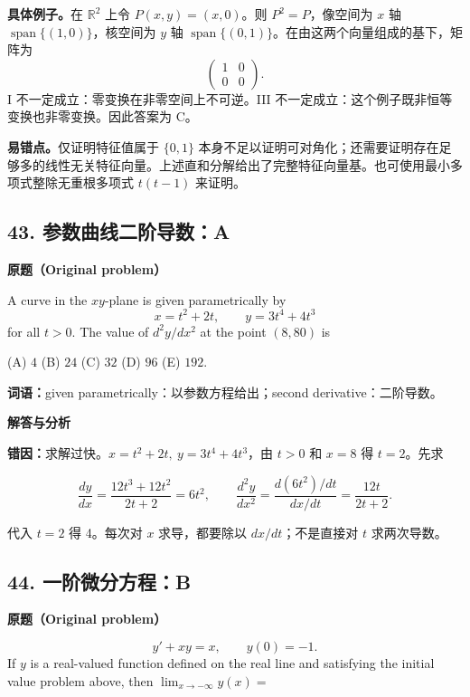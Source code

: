\documentclass[11pt,a4paper]{ctexart}
\begin{document}
\textbf{具体例子。}在 \(\mathbb R^2\) 上令 \(P(x,y)=(x,0)\)。则 \(P^2=P\)，像空间为 \(x\) 轴 \(\operatorname{span}\{(1,0)\}\)，核空间为 \(y\) 轴 \(\operatorname{span}\{(0,1)\}\)。在由这两个向量组成的基下，矩阵为
\[
\begin{pmatrix}1&0\\0&0\end{pmatrix}.
\]
I 不一定成立：零变换在非零空间上不可逆。III 不一定成立：这个例子既非恒等变换也非零变换。因此答案为 C。

\textbf{易错点。}仅证明特征值属于 \(\{0,1\}\) 本身不足以证明可对角化；还需要证明存在足够多的线性无关特征向量。上述直和分解给出了完整特征向量基。也可使用最小多项式整除无重根多项式 \(t(t-1)\) 来证明。

\hypertarget{ux53c2ux6570ux66f2ux7ebfux4e8cux9636ux5bfcux6570a}{%
\subsection{43.
参数曲线二阶导数：A}\label{ux53c2ux6570ux66f2ux7ebfux4e8cux9636ux5bfcux6570a}}

\textbf{原题（Original problem）}\par
A curve in the $xy$-plane is given parametrically by
\[x=t^2+2t,\qquad y=3t^4+4t^3\]
for all $t>0$. The value of $d^2y/dx^2$ at the point $(8,80)$ is

(A) $4$ \quad (B) $24$ \quad (C) $32$ \quad (D) $96$ \quad (E) $192$.

\textbf{词语：}given parametrically：以参数方程给出；second derivative：二阶导数。

\textbf{解答与分析}\par


\textbf{错因：}求解过快。\(x=t^2+2t,\ y=3t^4+4t^3\)，由 \(t>0\) 和
\(x=8\) 得 \(t=2\)。先求

\[\frac{dy}{dx}=\frac{12t^3+12t^2}{2t+2}=6t^2,\qquad \frac{d^2y}{dx^2}=\frac{d(6t^2)/dt}{dx/dt}=\frac{12t}{2t+2}.\]

代入 \(t=2\) 得 4。每次对 \(x\) 求导，都要除以 \(dx/dt\)；不是直接对
\(t\) 求两次导数。

\hypertarget{ux4e00ux9636ux5faeux5206ux65b9ux7a0bb}{%
\subsection{44.
一阶微分方程：B}\label{ux4e00ux9636ux5faeux5206ux65b9ux7a0bb}}

\textbf{原题（Original problem）}\par
\[y'+xy=x,\qquad y(0)=-1.\]
If $y$ is a real-valued function defined on the real line and satisfying the initial value problem above, then $\displaystyle\lim_{x\to-\infty}y(x)=$
\end{document}
